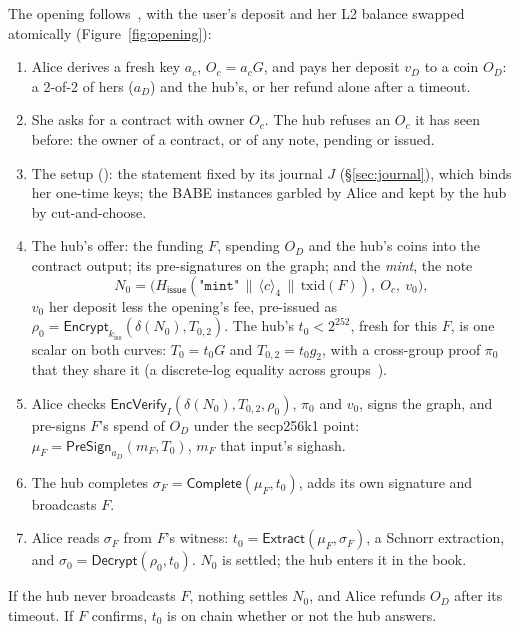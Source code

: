 \documentclass[11pt]{article}
\theoremstyle{plain}
\theoremstyle{definition}
\newcommand{\be}[2]{\langle #1\rangle_{#2}}
\newcommand{\Ht}[1]{H_{\textsf{#1}}}
\newcommand{\PSign}{\mathsf{PreSign}}
\newcommand{\Compl}{\mathsf{Complete}}
\newcommand{\Extr}{\mathsf{Extract}}
\newcommand{\kiss}{k_{\mathrm{iss}}}
\newcommand{\Oc}{O_c}
\newcommand{\Enc}{\mathsf{Encrypt}}
\newcommand{\EVfy}{\mathsf{EncVerify}}
\newcommand{\Dec}{\mathsf{Decrypt}}
\begin{document}
The opening follows~\cite{lichen}, with the user's deposit and her L2
balance swapped atomically (Figure~\ref{fig:opening}):
\begin{enumerate}[nosep]
\item Alice derives a fresh key $a_c$, $\Oc = a_cG$, and pays her
  deposit $v_D$ to a coin $O_D$: a 2-of-2 of hers ($a_D$) and the
  hub's, or her refund alone after a timeout.
\item She asks for a contract with owner $\Oc$. The hub refuses an $\Oc$
  it has seen before: the owner of a contract, or of any note, pending
  or issued.
\item The setup (\cite{lichen}): the statement fixed by its journal $J$
  (\S\ref{sec:journal}), which binds her one-time keys; the BABE
  instances garbled by Alice and kept by the hub by cut-and-choose.
\item The hub's offer: the funding $F$, spending $O_D$ and the hub's
  coins into the contract output; its pre-signatures on the graph; and
  the \emph{mint}, the note
  \[
    N_0 = \big(\Ht{issue}(\texttt{"mint"} \,\|\, \be{c}{4} \,\|\,
    \mathrm{txid}(F)),\ \Oc,\ v_0\big),
  \]
  $v_0$ her deposit less the opening's fee, pre-issued as $\rho_0 =
  \Enc_{\kiss}(\delta(N_0), T_{0,2})$. The hub's $t_0 < 2^{252}$, fresh for
  this $F$, is one scalar on both curves: $T_0 = t_0G$ and $T_{0,2} =
  t_0 g_2$, with a cross-group proof $\pi_0$ that they share it
  (a discrete-log equality across groups~\cite{dleqx}).
\item Alice checks $\EVfy_I(\delta(N_0), T_{0,2}, \rho_0)$, $\pi_0$ and
  $v_0$, signs the graph, and pre-signs $F$'s spend of $O_D$ under the
  secp256k1 point: $\mu_F = \PSign_{a_D}(m_F, T_0)$, $m_F$ that input's
  sighash.
\item The hub completes $\sigma_F = \Compl(\mu_F, t_0)$, adds its own
  signature and broadcasts $F$.
\item Alice reads $\sigma_F$ from $F$'s witness: $t_0 = \Extr(\mu_F,
  \sigma_F)$, a Schnorr extraction, and $\sigma_0 = \Dec(\rho_0, t_0)$.
  $N_0$ is settled; the hub enters it in the book.
\end{enumerate}
If the hub never broadcasts $F$, nothing settles $N_0$, and Alice
refunds $O_D$ after its timeout. If $F$ confirms, $t_0$ is on chain
whether or not the hub answers.
\end{document}
